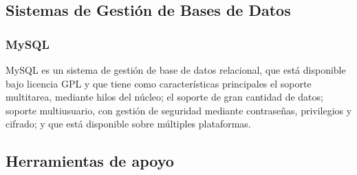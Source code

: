 \documentclass[12pt, a4paper, twoside]{book}
\begin{document}
	\subsection{Sistemas de Gestión de Bases de Datos}
	\subsubsection{MySQL}
	MySQL es un sistema de gestión de base de datos relacional, que está disponible
	bajo licencia GPL y que tiene como características principales el soporte multitarea,
	mediante hilos del núcleo; el soporte de gran cantidad de datos; soporte multiusuario,
	con gestión de seguridad mediante contraseñas, privilegios y cifrado; y que está
	disponible sobre múltiples plataformas.\cite{MySQL}
	\subsection{Herramientas de apoyo}
\end{document}
